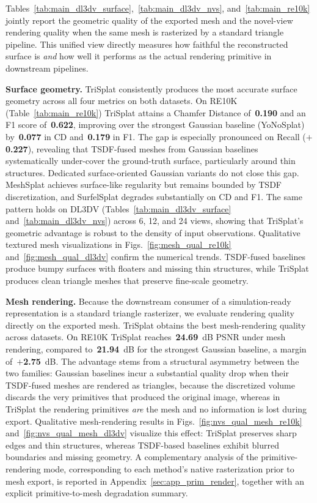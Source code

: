\documentclass{llmxive}
\providecommand{\method}{TriSplat\xspace}
\providecommand{\boldstart}[1]{\vspace{0.1in}\noindent\textbf{#1}}
\begin{document}
Tables~\ref{tab:main_dl3dv_surface},~\ref{tab:main_dl3dv_nvs}, and~\ref{tab:main_re10k} jointly report the geometric quality of the exported mesh and the novel-view rendering quality when the same mesh is rasterized by a standard triangle pipeline. This unified view directly measures how faithful the reconstructed surface is \emph{and} how well it performs as the actual rendering primitive in downstream pipelines.

\boldstart{Surface geometry.}
\method consistently produces the most accurate surface geometry across all four metrics on both datasets. On RE10K (Table~\ref{tab:main_re10k}) \method attains a Chamfer Distance of~\textbf{0.190} and an F1 score of~\textbf{0.622}, improving over the strongest Gaussian baseline (YoNoSplat) by~\textbf{0.077} in CD and~\textbf{0.179} in F1. The gap is especially pronounced on Recall ($+$\textbf{0.227}), revealing that TSDF-fused meshes from Gaussian baselines systematically under-cover the ground-truth surface, particularly around thin structures. Dedicated surface-oriented Gaussian variants do not close this gap. MeshSplat achieves surface-like regularity but remains bounded by TSDF discretization, and SurfelSplat degrades substantially on CD and F1. The same pattern holds on DL3DV (Tables~\ref{tab:main_dl3dv_surface} and~\ref{tab:main_dl3dv_nvs}) across 6, 12, and 24 views, showing that \method's geometric advantage is robust to the density of input observations. Qualitative textured mesh visualizations in Figs.~\ref{fig:mesh_qual_re10k} and~\ref{fig:mesh_qual_dl3dv} confirm the numerical trends. TSDF-fused baselines produce bumpy surfaces with floaters and missing thin structures, while \method produces clean triangle meshes that preserve fine-scale geometry.

\boldstart{Mesh rendering.}
Because the downstream consumer of a simulation-ready representation is a standard triangle rasterizer, we evaluate rendering quality directly on the exported mesh. \method obtains the best mesh-rendering quality across datasets. On RE10K \method reaches~\textbf{24.69}~dB PSNR under mesh rendering, compared to~\textbf{21.94}~dB for the strongest Gaussian baseline, a margin of~$+$\textbf{2.75}~dB. The advantage stems from a structural asymmetry between the two families: Gaussian baselines incur a substantial quality drop when their TSDF-fused meshes are rendered as triangles, because the discretized volume discards the very primitives that produced the original image, whereas in \method the rendering primitives \emph{are} the mesh and no information is lost during export. Qualitative mesh-rendering results in Figs.~\ref{fig:nvs_qual_mesh_re10k} and~\ref{fig:nvs_qual_mesh_dl3dv} visualize this effect: \method preserves sharp edges and thin structures, whereas TSDF-based baselines exhibit blurred boundaries and missing geometry. A complementary analysis of the primitive-rendering mode, corresponding to each method's native rasterization prior to mesh export, is reported in Appendix~\ref{sec:app_prim_render}, together with an explicit primitive-to-mesh degradation summary.
\end{document}

